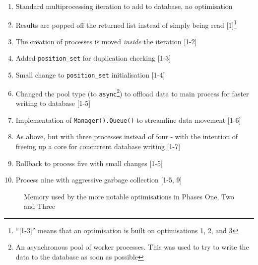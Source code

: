 \documentclass{report}
\newcommand{\tit}[1]{\textit{#1}}
\begin{document}
    \begin{enumerate}
    	\item Standard multiprocessing iteration to add to database, no optimisation
    	\item Results are popped off the returned list instead of simply being read [1]\footnote{\enquote{[1-3]} means that an optimisation is built on optimisations 1, 2, and 3}
    	\item The creation of processes is moved \tit{inside} the iteration [1-2]
    	\item Added \lstinline|position_set| for duplication checking [1-3]
    	\item Small change to \lstinline|position_set| initialisation [1-4]
    	\item Changed the pool type (to \lstinline|async|\footnote{An asynchronous pool of worker processes. This was used to try to write the data to the database as soon as possible}) to offload data to main process for faster writing to database [1-5]
    	\item Implementation of \lstinline|Manager().Queue()| to streamline data movement [1-6]
    	\item As above, but with three processes instead of four - with the intention of freeing up a core for concurrent database writing [1-7]
    	\item Rollback to process five with small changes [1-5]
    	\item Process nine with aggressive garbage collection [1-5, 9]
    \end{enumerate}
    
    \begin{figure}[h!]
    	\caption{Memory used by the more notable optimisations in Phases One, Two and Three}
    	\label{fig:memoryLoggerGraph}
    \end{figure}
    
\end{document}
